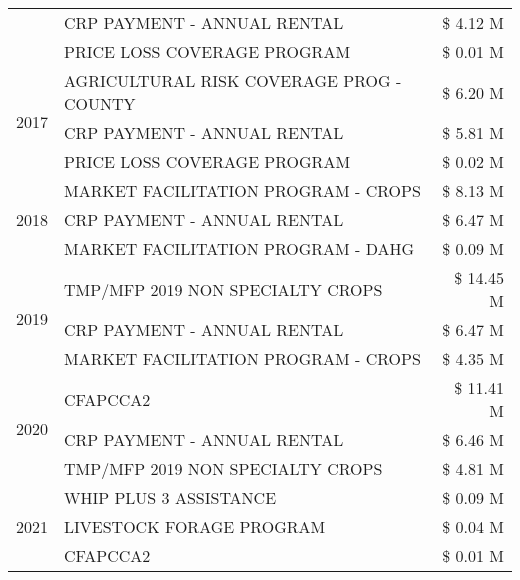 \begin{tabular}{llr}
 & CRP PAYMENT - ANNUAL RENTAL & \$ 4.12 M \\
 & PRICE LOSS COVERAGE PROGRAM & \$ 0.01 M \\
\cline{1-3}
\multirow[t]{3}{*}{2017} & AGRICULTURAL RISK COVERAGE PROG - COUNTY & \$ 6.20 M \\
 & CRP PAYMENT - ANNUAL RENTAL & \$ 5.81 M \\
 & PRICE LOSS COVERAGE PROGRAM & \$ 0.02 M \\
\cline{1-3}
\multirow[t]{3}{*}{2018} & MARKET FACILITATION PROGRAM - CROPS & \$ 8.13 M \\
 & CRP PAYMENT - ANNUAL RENTAL & \$ 6.47 M \\
 & MARKET FACILITATION PROGRAM - DAHG & \$ 0.09 M \\
\cline{1-3}
\multirow[t]{3}{*}{2019} & TMP/MFP 2019 NON SPECIALTY CROPS & \$ 14.45 M \\
 & CRP PAYMENT - ANNUAL RENTAL & \$ 6.47 M \\
 & MARKET FACILITATION PROGRAM - CROPS & \$ 4.35 M \\
\cline{1-3}
\multirow[t]{3}{*}{2020} & CFAPCCA2 & \$ 11.41 M \\
 & CRP PAYMENT - ANNUAL RENTAL & \$ 6.46 M \\
 & TMP/MFP 2019 NON SPECIALTY CROPS & \$ 4.81 M \\
\cline{1-3}
\multirow[t]{3}{*}{2021} & WHIP PLUS 3 ASSISTANCE & \$ 0.09 M \\
 & LIVESTOCK FORAGE PROGRAM & \$ 0.04 M \\
 & CFAPCCA2 & \$ 0.01 M \\
\cline{1-3}
\bottomrule
\end{tabular}

